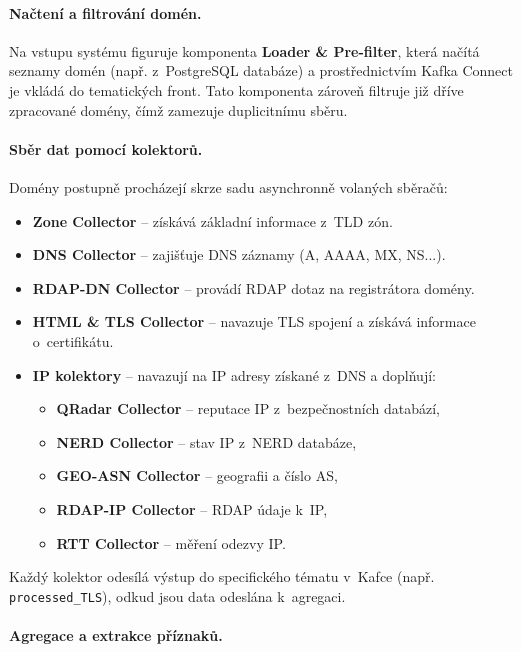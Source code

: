 \paragraph{Načtení a filtrování domén.}

Na vstupu systému figuruje komponenta \textbf{Loader \& Pre-filter}, která načítá seznamy domén (např. z~PostgreSQL databáze) a prostřednictvím Kafka Connect je vkládá do tematických front. Tato komponenta zároveň filtruje již dříve zpracované domény, čímž zamezuje duplicitnímu sběru.

\paragraph{Sběr dat pomocí kolektorů.}

Domény postupně procházejí skrze sadu asynchronně volaných sběračů:

\begin{itemize}
    \item \textbf{Zone Collector} – získává základní informace z~TLD zón.
    \item \textbf{DNS Collector} – zajišťuje DNS záznamy (A, AAAA, MX, NS...).
    \item \textbf{RDAP-DN Collector} – provádí RDAP dotaz na registrátora domény.
    \item \textbf{HTML \& TLS Collector} – navazuje TLS spojení a získává informace o~certifikátu.
    \item \textbf{IP kolektory} – navazují na IP adresy získané z~DNS a doplňují:
    \begin{itemize}
        \item \textbf{QRadar Collector} – reputace IP z~bezpečnostních databází,
        \item \textbf{NERD Collector} – stav IP z~NERD databáze,
        \item \textbf{GEO-ASN Collector} – geografii a číslo AS,
        \item \textbf{RDAP-IP Collector} – RDAP údaje k~IP,
        \item \textbf{RTT Collector} – měření odezvy IP.
    \end{itemize}
\end{itemize}

\noindent Každý kolektor odesílá výstup do specifického tématu v~Kafce (např. \texttt{processed\_TLS}), odkud jsou data odeslána k~agregaci.

\paragraph{Agregace a extrakce příznaků.}

